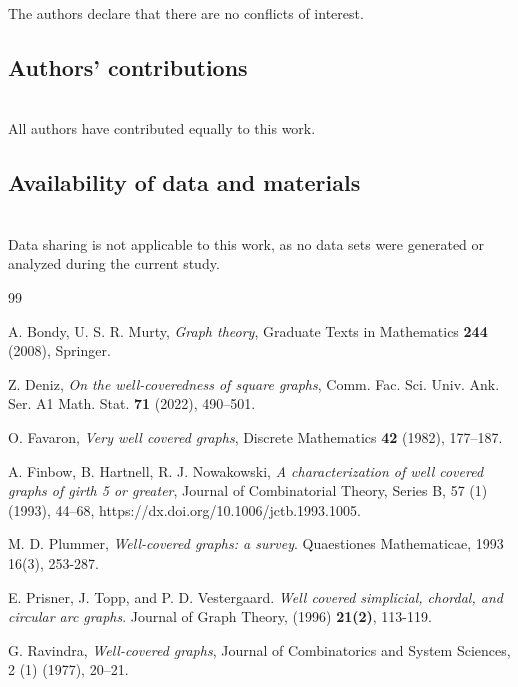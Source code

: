 \documentclass[10pt,a4paper]{amsart}
\numberwithin{equation}{section}
\theoremstyle{definition}
\begin{document}
  \noindent The authors declare that there are no conflicts of interest.
  
  
  \subsection*{\bf Authors' contributions}\ \\[-0.3cm]
  
  \noindent All authors have contributed equally to this work.
  
  
  
   
  
  \subsection*{\bf Availability of data and materials}\ \\[-0.3cm]
  
  \noindent Data sharing is not applicable to this work, as no data sets were generated or analyzed during the current study.
  
    
    
\begin{thebibliography}{99}

 A. Bondy, U. S. R. Murty, \textit{Graph theory}, Graduate Texts in Mathematics {\bf 244}  (2008), Springer.
 
Z. Deniz,
\emph{On the well-coveredness of square graphs},
Comm. Fac. Sci. Univ. Ank. Ser. A1 Math. Stat. {\bf 71} (2022), 490--501.

 O. Favaron, \textit{Very well covered graphs}, Discrete Mathematics {\bf 42} (1982), 177--187.

 A. Finbow, B. Hartnell, R. J. Nowakowski, \emph{A characterization of well covered graphs of girth 5 or greater}, Journal of Combinatorial Theory, Series B, 57 (1) (1993), 44–68,
https://dx.doi.org/10.1006/jctb.1993.1005.

 

 M. D. Plummer, \emph{Well-covered graphs: a survey}. Quaestiones Mathematicae, 1993 16(3), 253-287.
 

  E. Prisner, J. Topp, and P. D. Vestergaard. \emph{Well covered simplicial, chordal, and circular arc graphs}. Journal of Graph Theory, (1996) {\bf 21(2)}, 113-119.

 G. Ravindra, \emph{Well-covered graphs}, Journal of Combinatorics and System Sciences, 2 (1) (1977), 20–21.

\end{thebibliography}
\end{document}
